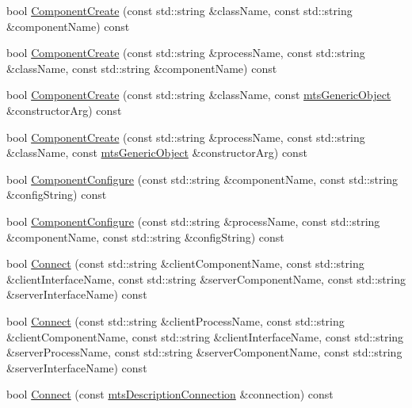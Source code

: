 {\bf }\par
\begin{DoxyCompactItemize}
\item 
bool \hyperlink{classmts_manager_component_services_a31785266eab548a48d80fa2ed08bc014}{Component\-Create} (const std\-::string \&class\-Name, const std\-::string \&component\-Name) const 
\item 
bool \hyperlink{classmts_manager_component_services_ac599f7d70cb120ece10738d85d20769f}{Component\-Create} (const std\-::string \&process\-Name, const std\-::string \&class\-Name, const std\-::string \&component\-Name) const 
\item 
bool \hyperlink{classmts_manager_component_services_a42295c2a3b32c5c0a1cc60b06f9ecc83}{Component\-Create} (const std\-::string \&class\-Name, const \hyperlink{classmts_generic_object}{mts\-Generic\-Object} \&constructor\-Arg) const 
\item 
bool \hyperlink{classmts_manager_component_services_a0dab190b31f59d5cfd2084ecbc4a2f66}{Component\-Create} (const std\-::string \&process\-Name, const std\-::string \&class\-Name, const \hyperlink{classmts_generic_object}{mts\-Generic\-Object} \&constructor\-Arg) const 
\item 
bool \hyperlink{classmts_manager_component_services_a2bf55bf6eaaa1c9d06e014fa1ea5c5f3}{Component\-Configure} (const std\-::string \&component\-Name, const std\-::string \&config\-String) const 
\item 
bool \hyperlink{classmts_manager_component_services_a6f13d3fc2eebbc1a21199c7554aae16e}{Component\-Configure} (const std\-::string \&process\-Name, const std\-::string \&component\-Name, const std\-::string \&config\-String) const 
\item 
bool \hyperlink{classmts_manager_component_services_a862a86135ddef6f3c7fc771ecbf395d8}{Connect} (const std\-::string \&client\-Component\-Name, const std\-::string \&client\-Interface\-Name, const std\-::string \&server\-Component\-Name, const std\-::string \&server\-Interface\-Name) const 
\item 
bool \hyperlink{classmts_manager_component_services_a31924511ca987ea4c7f632f91e922b83}{Connect} (const std\-::string \&client\-Process\-Name, const std\-::string \&client\-Component\-Name, const std\-::string \&client\-Interface\-Name, const std\-::string \&server\-Process\-Name, const std\-::string \&server\-Component\-Name, const std\-::string \&server\-Interface\-Name) const 
\item 
bool \hyperlink{classmts_manager_component_services_a0dd0677b3e5877c80caf8f7f53ad69f4}{Connect} (const \hyperlink{classmts_description_connection}{mts\-Description\-Connection} \&connection) const 

\end{DoxyCompactItemize}

